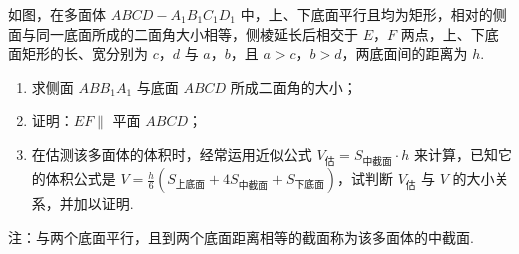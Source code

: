 \begin{problem}
如图，在多面体 \(ABCD-A_{1}B_{1}C_{1}D_{1}\) 中，上、下底面平行且均为矩形，相对的侧面与同一底面所成的二面角大小相等，侧棱延长后相交于 \(E\)，\(F\) 两点，上、下底面矩形的长、宽分别为 \(c\)，\(d\) 与 \(a\)，\(b\)，且 \(a>c\)，\(b>d\)，两底面间的距离为 \(h\).

\begin{enumerate}
\item 求侧面 \(ABB_{1}A_{1}\) 与底面 \(ABCD\) 所成二面角的大小；
\item 证明：\(EF \parallel\) 平面 \(ABCD\)；
\item 在估测该多面体的体积时，经常运用近似公式 \(V_{\text{估}}=S_{\text{中截面}}\cdot h\) 来计算，已知它的体积公式是 \(V=\frac{h}{6}(S_{\text{上底面}}+4S_{\text{中截面}}+S_{\text{下底面}})\)，试判断 \(V_{\text{估}}\) 与 \(V\) 的大小关系，并加以证明.
\end{enumerate}

\medskip
注：与两个底面平行，且到两个底面距离相等的截面称为该多面体的中截面.



\end{problem}
